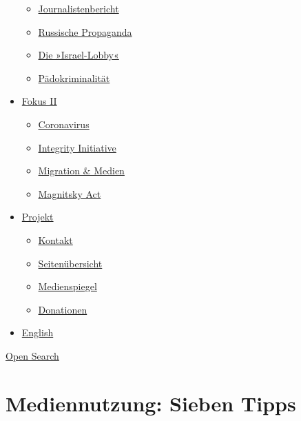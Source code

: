 \begin{itemize}
  \begin{itemize}
  \tightlist
  \item
    \href{https://swprs.org/bericht-eines-journalisten/}{Journalistenbericht}
  \item
    \href{https://swprs.org/russische-propaganda/}{Russische Propaganda}
  \item
    \href{https://swprs.org/die-israel-lobby-fakten-und-mythen/}{Die
    »Israel-Lobby«}
  \item
    \href{https://swprs.org/geopolitik-und-paedokriminalitaet/}{Pädokriminalität}
  \end{itemize}
\item
  \href{https://swprs.org/migration-und-medien/}{Fokus II}

  \begin{itemize}
  \tightlist
  \item
    \href{https://swprs.org/covid-19-hinweis-ii/}{Coronavirus}
  \item
    \href{https://swprs.org/die-integrity-initiative/}{Integrity
    Initiative}
  \item
    \href{https://swprs.org/migration-und-medien/}{Migration \& Medien}
  \item
    \href{https://swprs.org/der-fall-magnitsky/}{Magnitsky Act}
  \end{itemize}
\item
  \href{https://swprs.org/kontakt/}{Projekt}

  \begin{itemize}
  \tightlist
  \item
    \href{https://swprs.org/kontakt/}{Kontakt}
  \item
    \href{https://swprs.org/uebersicht/}{Seitenübersicht}
  \item
    \href{https://swprs.org/medienspiegel/}{Medienspiegel}
  \item
    \href{https://swprs.org/donationen/}{Donationen}
  \end{itemize}
\item
  \href{https://swprs.org/contact/}{English}
\end{itemize}

\protect\hyperlink{}{Open Search}

\hypertarget{mediennutzung-sieben-tipps}{%
\section{Mediennutzung: Sieben Tipps}\label{mediennutzung-sieben-tipps}}

